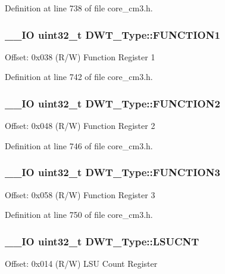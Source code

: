 Definition at line 738 of file core\-\_\-cm3.\-h.

\hypertarget{struct_d_w_t___type_a3345a33476ee58e165447a3212e6d747}{
\subsubsection[{F\-U\-N\-C\-T\-I\-O\-N1}]{\setlength{\rightskip}{0pt plus 5cm}\-\_\-\-\_\-\-I\-O {\bf uint32\-\_\-t} D\-W\-T\-\_\-\-Type\-::\-F\-U\-N\-C\-T\-I\-O\-N1}}\label{struct_d_w_t___type_a3345a33476ee58e165447a3212e6d747}
Offset\-: 0x038 (R/\-W) Function Register 1 

Definition at line 742 of file core\-\_\-cm3.\-h.

\hypertarget{struct_d_w_t___type_acba1654190641a3617fcc558b5e3f87b}{
\subsubsection[{F\-U\-N\-C\-T\-I\-O\-N2}]{\setlength{\rightskip}{0pt plus 5cm}\-\_\-\-\_\-\-I\-O {\bf uint32\-\_\-t} D\-W\-T\-\_\-\-Type\-::\-F\-U\-N\-C\-T\-I\-O\-N2}}\label{struct_d_w_t___type_acba1654190641a3617fcc558b5e3f87b}
Offset\-: 0x048 (R/\-W) Function Register 2 

Definition at line 746 of file core\-\_\-cm3.\-h.

\hypertarget{struct_d_w_t___type_a80bd242fc05ca80f9db681ce4d82e890}{
\subsubsection[{F\-U\-N\-C\-T\-I\-O\-N3}]{\setlength{\rightskip}{0pt plus 5cm}\-\_\-\-\_\-\-I\-O {\bf uint32\-\_\-t} D\-W\-T\-\_\-\-Type\-::\-F\-U\-N\-C\-T\-I\-O\-N3}}\label{struct_d_w_t___type_a80bd242fc05ca80f9db681ce4d82e890}
Offset\-: 0x058 (R/\-W) Function Register 3 

Definition at line 750 of file core\-\_\-cm3.\-h.

\hypertarget{struct_d_w_t___type_aeba92e6c7fd3de4ba06bfd94f47f5b35}{
\subsubsection[{L\-S\-U\-C\-N\-T}]{\setlength{\rightskip}{0pt plus 5cm}\-\_\-\-\_\-\-I\-O {\bf uint32\-\_\-t} D\-W\-T\-\_\-\-Type\-::\-L\-S\-U\-C\-N\-T}}\label{struct_d_w_t___type_aeba92e6c7fd3de4ba06bfd94f47f5b35}
Offset\-: 0x014 (R/\-W) L\-S\-U Count Register 

